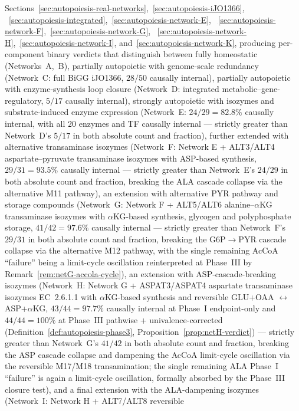 \documentclass[11pt,a4paper]{article}
\theoremstyle{plain}
\theoremstyle{definition}
\theoremstyle{remark}
\begin{document}
Sections~\ref{sec:autopoiesis-real-networks},~\ref{sec:autopoiesis-iJO1366},
~\ref{sec:autopoiesis-integrated},~\ref{sec:autopoiesis-network-E},
~\ref{sec:autopoiesis-network-F},~\ref{sec:autopoiesis-network-G},
~\ref{sec:autopoiesis-network-H},~\ref{sec:autopoiesis-network-I},
and~\ref{sec:autopoiesis-network-K},
producing per-component binary verdicts that distinguish between fully
homeostatic (Networks~A,~B), partially autopoietic with genome-scale
redundancy (Network~C: full BiGG iJO1366, $28/50$ causally internal),
partially autopoietic with enzyme-synthesis loop closure (Network~D:
integrated metabolic--gene-regulatory, $5/17$ causally internal),
strongly autopoietic with isozymes and substrate-induced enzyme
expression (Network~E: $24/29 = 82.8\%$ causally internal, with all
$20$ enzymes and TF causally internal --- strictly greater than
Network~D's $5/17$ in both absolute count and fraction), further
extended with alternative transaminase isozymes (Network~F: Network E
+ ALT3/ALT4 aspartate--pyruvate transaminase isozymes with ASP-based
synthesis, $29/31 = 93.5\%$ causally internal --- strictly greater
than Network~E's $24/29$ in both absolute count and fraction, breaking
the ALA cascade collapse via the alternative M11 pathway), an
extension with alternative PYR pathway and storage compounds
(Network~G: Network F + ALT5/ALT6 alanine--$\alpha$KG transaminase
isozymes with $\alpha$KG-based synthesis, glycogen and polyphosphate
storage, $41/42 = 97.6\%$ causally internal --- strictly greater than
Network~F's $29/31$ in both absolute count and fraction, breaking the
G6P$\to$PYR cascade collapse via the alternative M12 pathway, with
the single remaining AcCoA ``failure'' being a limit-cycle oscillation
reinterpreted at Phase~III by
Remark~\ref{rem:netG-accola-cycle}), an extension with
ASP-cascade-breaking isozymes (Network~H: Network G + ASPAT3/ASPAT4
aspartate transaminase isozymes EC~2.6.1.1 with $\alpha$KG-based
synthesis and reversible GLU+OAA $\leftrightarrow$ ASP+$\alpha$KG,
$43/44 = 97.7\%$ causally internal at Phase~I endpoint-only and
$44/44 = 100\%$ at Phase~III pathwise + univalence-corrected
(Definition~\ref{def:autopoiesis-phase3},
Proposition~\ref{prop:netH-verdict}) --- strictly greater than
Network~G's $41/42$ in both absolute count and fraction, breaking the
ASP cascade collapse and dampening the AcCoA limit-cycle oscillation
via the reversible M17/M18 transamination; the single remaining ALA
Phase~I ``failure'' is again a limit-cycle oscillation, formally
absorbed by the Phase~III closure test), and a final extension with
the ALA-dampening isozymes (Network~I: Network H + ALT7/ALT8 reversible
\end{document}
